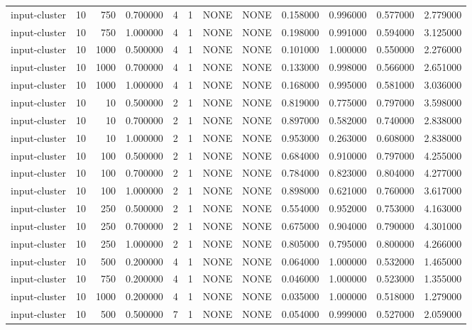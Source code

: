 \begin{tabular}{lrrrllllrrrr}
input-cluster & 10 & 750 & 0.700000 & 4 & 1 & NONE & NONE & 0.158000 & 0.996000 & 0.577000 & 2.779000 \\
input-cluster & 10 & 750 & 1.000000 & 4 & 1 & NONE & NONE & 0.198000 & 0.991000 & 0.594000 & 3.125000 \\
input-cluster & 10 & 1000 & 0.500000 & 4 & 1 & NONE & NONE & 0.101000 & 1.000000 & 0.550000 & 2.276000 \\
input-cluster & 10 & 1000 & 0.700000 & 4 & 1 & NONE & NONE & 0.133000 & 0.998000 & 0.566000 & 2.651000 \\
input-cluster & 10 & 1000 & 1.000000 & 4 & 1 & NONE & NONE & 0.168000 & 0.995000 & 0.581000 & 3.036000 \\
input-cluster & 10 & 10 & 0.500000 & 2 & 1 & NONE & NONE & 0.819000 & 0.775000 & 0.797000 & 3.598000 \\
input-cluster & 10 & 10 & 0.700000 & 2 & 1 & NONE & NONE & 0.897000 & 0.582000 & 0.740000 & 2.838000 \\
input-cluster & 10 & 10 & 1.000000 & 2 & 1 & NONE & NONE & 0.953000 & 0.263000 & 0.608000 & 2.838000 \\
input-cluster & 10 & 100 & 0.500000 & 2 & 1 & NONE & NONE & 0.684000 & 0.910000 & 0.797000 & 4.255000 \\
input-cluster & 10 & 100 & 0.700000 & 2 & 1 & NONE & NONE & 0.784000 & 0.823000 & 0.804000 & 4.277000 \\
input-cluster & 10 & 100 & 1.000000 & 2 & 1 & NONE & NONE & 0.898000 & 0.621000 & 0.760000 & 3.617000 \\
input-cluster & 10 & 250 & 0.500000 & 2 & 1 & NONE & NONE & 0.554000 & 0.952000 & 0.753000 & 4.163000 \\
input-cluster & 10 & 250 & 0.700000 & 2 & 1 & NONE & NONE & 0.675000 & 0.904000 & 0.790000 & 4.301000 \\
input-cluster & 10 & 250 & 1.000000 & 2 & 1 & NONE & NONE & 0.805000 & 0.795000 & 0.800000 & 4.266000 \\
input-cluster & 10 & 500 & 0.200000 & 4 & 1 & NONE & NONE & 0.064000 & 1.000000 & 0.532000 & 1.465000 \\
input-cluster & 10 & 750 & 0.200000 & 4 & 1 & NONE & NONE & 0.046000 & 1.000000 & 0.523000 & 1.355000 \\
input-cluster & 10 & 1000 & 0.200000 & 4 & 1 & NONE & NONE & 0.035000 & 1.000000 & 0.518000 & 1.279000 \\
input-cluster & 10 & 500 & 0.500000 & 7 & 1 & NONE & NONE & 0.054000 & 0.999000 & 0.527000 & 2.059000 \\

\end{tabular}
